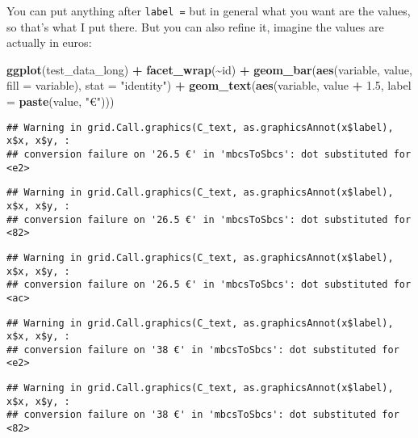 \documentclass[
]{article}
\newenvironment{Shaded}{\begin{snugshade}}{\end{snugshade}}
\newcommand{\DataTypeTok}[1]{\textcolor[rgb]{0.13,0.29,0.53}{#1}}
\newcommand{\FloatTok}[1]{\textcolor[rgb]{0.00,0.00,0.81}{#1}}
\newcommand{\KeywordTok}[1]{\textcolor[rgb]{0.13,0.29,0.53}{\textbf{#1}}}
\newcommand{\NormalTok}[1]{#1}
\newcommand{\OperatorTok}[1]{\textcolor[rgb]{0.81,0.36,0.00}{\textbf{#1}}}
\newcommand{\StringTok}[1]{\textcolor[rgb]{0.31,0.60,0.02}{#1}}
\begin{document}
You can put anything after \texttt{label\ =} but in general what you want are the values, so that's what
I put there. But you can also refine it, imagine the values are actually in euros:

\begin{Shaded}
\begin{Highlighting}[]
\KeywordTok{ggplot}\NormalTok{(test\_data\_long) }\OperatorTok{+}
\StringTok{  }\KeywordTok{facet\_wrap}\NormalTok{(}\OperatorTok{\textasciitilde{}}\NormalTok{id) }\OperatorTok{+}
\StringTok{  }\KeywordTok{geom\_bar}\NormalTok{(}\KeywordTok{aes}\NormalTok{(variable, value, }\DataTypeTok{fill =}\NormalTok{ variable), }\DataTypeTok{stat =} \StringTok{"identity"}\NormalTok{) }\OperatorTok{+}
\StringTok{  }\KeywordTok{geom\_text}\NormalTok{(}\KeywordTok{aes}\NormalTok{(variable, value }\OperatorTok{+}\StringTok{ }\FloatTok{1.5}\NormalTok{, }\DataTypeTok{label =} \KeywordTok{paste}\NormalTok{(value, }\StringTok{"€"}\NormalTok{)))}
\end{Highlighting}
\end{Shaded}

\begin{verbatim}
## Warning in grid.Call.graphics(C_text, as.graphicsAnnot(x$label), x$x, x$y, :
## conversion failure on '26.5 €' in 'mbcsToSbcs': dot substituted for <e2>
\end{verbatim}

\begin{verbatim}
## Warning in grid.Call.graphics(C_text, as.graphicsAnnot(x$label), x$x, x$y, :
## conversion failure on '26.5 €' in 'mbcsToSbcs': dot substituted for <82>
\end{verbatim}

\begin{verbatim}
## Warning in grid.Call.graphics(C_text, as.graphicsAnnot(x$label), x$x, x$y, :
## conversion failure on '26.5 €' in 'mbcsToSbcs': dot substituted for <ac>
\end{verbatim}

\begin{verbatim}
## Warning in grid.Call.graphics(C_text, as.graphicsAnnot(x$label), x$x, x$y, :
## conversion failure on '38 €' in 'mbcsToSbcs': dot substituted for <e2>
\end{verbatim}

\begin{verbatim}
## Warning in grid.Call.graphics(C_text, as.graphicsAnnot(x$label), x$x, x$y, :
## conversion failure on '38 €' in 'mbcsToSbcs': dot substituted for <82>
\end{verbatim}
\end{document}
